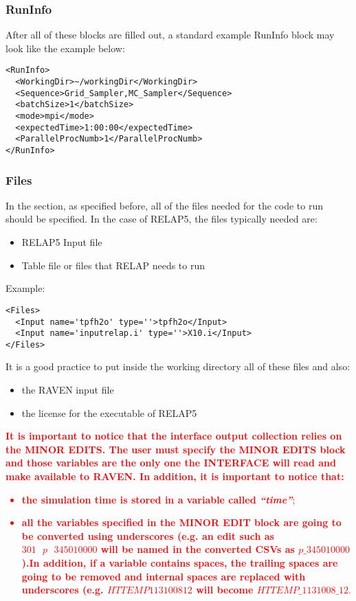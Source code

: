 \subsubsection{RunInfo}
After all of these blocks are filled out, a standard example RunInfo block may
look like the example below:
\begin{lstlisting}[style=XML]
<RunInfo>
  <WorkingDir>~/workingDir</WorkingDir>
  <Sequence>Grid_Sampler,MC_Sampler</Sequence>
  <batchSize>1</batchSize>
  <mode>mpi</mode>
  <expectedTime>1:00:00</expectedTime>
  <ParallelProcNumb>1</ParallelProcNumb>
</RunInfo>
\end{lstlisting}
\subsubsection{Files}
In the  section, as specified before, all of the files needed for
the code to run should be specified.
%
In the case of RELAP5, the files typically needed are:
\begin{itemize}
  \item RELAP5 Input file
  \item Table file or files that RELAP needs to run
\end{itemize}
Example:
\begin{lstlisting}[style=XML]
<Files>
  <Input name='tpfh2o' type=''>tpfh2o</Input>
  <Input name='inputrelap.i' type=''>X10.i</Input>
</Files>
\end{lstlisting}

It is a good practice to put inside the working directory all of these files and
also:
\begin{itemize}
  \item the RAVEN input file
  \item the license for the executable of RELAP5
\end{itemize}
\textcolor{red}{
\textbf{It is important to notice that the interface output collection relies on the MINOR EDITS. The user must specify the MINOR
EDITS block and those variables are the only one the INTERFACE will read and make available to RAVEN. In addition, it is important to notice that:}
\begin{itemize}
  \item \textbf{the simulation time is stored in a variable called \textit{``time''}};
  \item \textbf{all the variables specified in the MINOR EDIT block are going to be converted using underscores (e.g.  an edit such as
  $301 \:\:\: p \:\:\: 345010000$ will be named in the converted CSVs as $p\_345010000$).In addition, if a variable contains spaces, the trailing spaces
   are going to be removed and internal spaces are replaced with underscores (e.g. $HTTEMP 1131008 12$ will become $HTTEMP\_1131008\_12$}.
\end{itemize}
}

